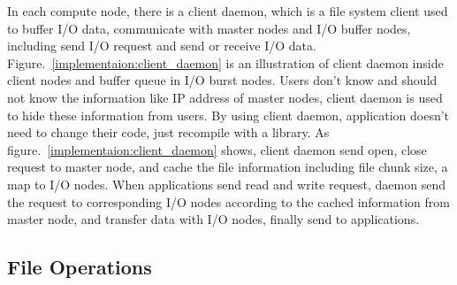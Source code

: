 In each compute node, there is a client daemon, which is a file system client used to buffer I/O
data, communicate with master nodes and I/O buffer nodes, including send I/O request and send or
receive I/O data.
 Figure.~\ref{implementaion:client_daemon}
is an illustration of client daemon inside client nodes and buffer queue in I/O burst nodes.
Users don't know and should not know the information like IP address of master nodes,  client daemon
is used to hide these information from users.
By using client daemon, application doesn't need to change their code, just recompile with a
library.
As figure.~\ref{implementaion:client_daemon} shows, client daemon send open, close request to master node, and cache the file information including file chunk size, a map to I/O nodes.
When applications send read and write request, daemon send the request to corresponding I/O nodes
according to the cached information from master node, and transfer data with I/O nodes, finally
send to applications.



\subsection{File Operations}

